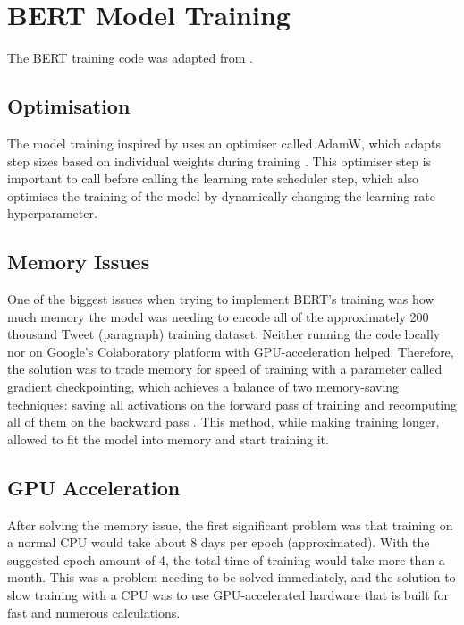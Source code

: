 \documentclass{l4proj}
\begin{document}
\section{BERT Model Training}
\label{sec:imp_BERT}

The BERT training code was adapted from \citet{BERTAllFeatures}.

\subsection{Optimisation}

The model training inspired by \citet{BERTAllFeatures} uses an optimiser called AdamW, which adapts step sizes based on individual weights during training \citep{AdamW}. This optimiser step is important to call before calling the learning rate scheduler step, which also optimises the training of the model by dynamically changing the learning rate hyperparameter.

\subsection{Memory Issues}

One of the biggest issues when trying to implement BERT's training was how much memory the model was needing to encode all of the approximately 200 thousand Tweet (paragraph) training dataset. Neither running the code locally nor on Google's Colaboratory platform with GPU-acceleration helped. Therefore, the solution was to trade memory for speed of training with a parameter called gradient checkpointing, which achieves a balance of two memory-saving techniques: saving all activations on the forward pass of training and recomputing all of them on the backward pass \citep{BERTGradientCheck}. This method, while making training longer, allowed to fit the model into memory and start training it.

\subsection{GPU Acceleration}

After solving the memory issue, the first significant problem was that training on a normal CPU would take about 8 days per epoch (approximated). With the suggested epoch amount of 4, the total time of training would take more than a month. This was a problem needing to be solved immediately, and the solution to slow training with a CPU was to use GPU-accelerated hardware that is built for fast and numerous calculations.
\end{document}
